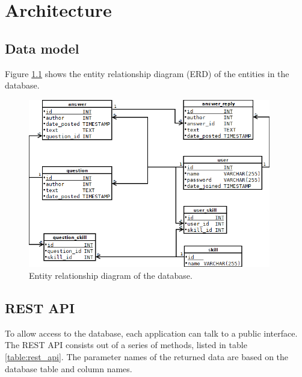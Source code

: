 \chapter{Architecture}\label{chapter:architecture}


\section{Data model}\label{section:datamodel}

Figure \ref{figure:erd} shows the entity relationship diagram (ERD) of the entities in the database.

\begin{figure}
	\includegraphics[width=400px]{img/erd}
	\caption{Entity relationship diagram of the database.}
	\label{figure:erd}
\end{figure}



\section{REST API}\label{section:restapi}

To allow access to the database, each application can talk to a public interface. The REST API consists out of a series of methods, listed in table \ref{table:rest_api}. The parameter names of the returned data are based on the database table and column names.



